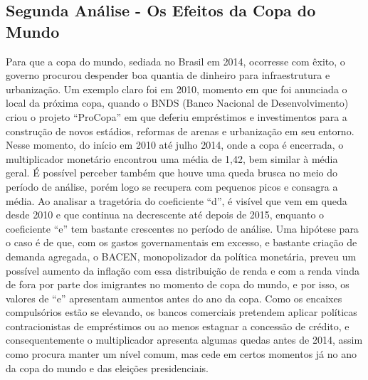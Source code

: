 \documentclass[12pt]{article}
\begin{document}
\subsection*{Segunda Análise - Os Efeitos da Copa do Mundo}

Para que a copa do mundo, sediada no Brasil em 2014, ocorresse com
êxito, o governo procurou despender boa quantia de dinheiro para
infraestrutura e urbanização. Um exemplo claro foi em 2010, momento em
que foi anunciada o local da próxima copa, quando o BNDS (Banco Nacional
de Desenvolvimento) criou o projeto ``ProCopa'' em que deferiu
empréstimos e investimentos para a construção de novos estádios,
reformas de arenas e urbanização em seu entorno. Nesse momento, do
início em 2010 até julho 2014, onde a copa é encerrada, o multiplicador
monetário encontrou uma média de 1,42, bem similar à média geral. É
possível perceber também que houve uma queda brusca no meio do período
de análise, porém logo se recupera com pequenos picos e consagra a
média. Ao analisar a tragetória do coeficiente ``d'', é visível que vem
em queda desde 2010 e que continua na decrescente até depois de 2015,
enquanto o coeficiente ``e'' tem bastante crescentes no período de
análise. Uma hipótese para o caso é de que, com os gastos governamentais
em excesso, e bastante criação de demanda agregada, o BACEN,
monopolizador da política monetária, preveu um possível aumento da
inflação com essa distribuição de renda e com a renda vinda de fora por
parte dos imigrantes no momento de copa do mundo, e por isso, os valores
de ``e'' apresentam aumentos antes do ano da copa. Como os encaixes
compulsórios estão se elevando, os bancos comerciais pretendem aplicar
políticas contracionistas de empréstimos ou ao menos estagnar a
concessão de crédito, e consequentemente o multiplicador apresenta
algumas quedas antes de 2014, assim como procura manter um nível comum,
mas cede em certos momentos já no ano da copa do mundo e das eleições
presidenciais.

\begingroup\fontsize{10}{12}\selectfont
\end{document}

